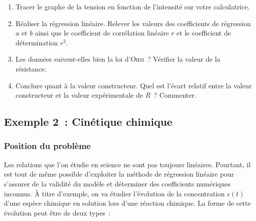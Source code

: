 \documentclass[a4paper, 12pt, garamond]{book}
\begin{document}
\begin{enumerate}
	\item Tracer le graphe de la tension en fonction de l'intensité sur votre
	      calculatrice.
	\item Réaliser la régression linéaire. Relever les valeurs des coefficients de
	      régression $a$ et $b$ ainsi que le coefficient de corrélation linéaire
	      $r$ et le coefficient de détermination $r^2$.
	\item Les données suivent-elles bien la loi d'\textsc{Ohm}~? Vérifier la
	      valeur de la résistance.
	      \bigbreak
	\item Conclure quant à la valeur constructeur. Quel est l'écart relatif entre
	      la valeur constructeur et la valeur expérimentale de $R$~? Commenter.
	      \bigbreak
\end{enumerate}

\subsection{Exemple 2~: Cinétique chimique}

\subsubsection{Position du problème}

Les relations que l'on étudie en science ne sont pas toujours linéaires.
Pourtant, il est tout de même possible d'exploiter la méthode de
régression linéaire pour s'assurer de la validité du modèle et
déterminer des coefficients numériques inconnus. À titre d'exemple, on va
étudier l'évolution de la concentration $c(t)$ d'une espèce chimique en
solution lors d'une réaction chimique. La forme de cette évolution peut
être de deux types~:
\end{document}
